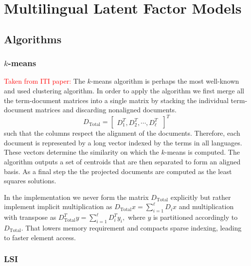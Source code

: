 \documentclass[twoside,11pt]{article}
\newcommand{\oldText}[1]{\textcolor{red}{#1:}\color{blue}}
\begin{document}
\section{Multilingual Latent Factor Models}

\subsection{Algorithms}

\subsubsection{$k$-means}

{\oldText{Taken from ITI paper}
The $k$-means algorithm is perhaps the most well-known and used clustering algorithm. In order to apply the algorithm we first merge all the term-document matrices into a single matrix by stacking the individual term-document matrices and discarding nonaligned documents.
$$D_{\mbox{Total}} = \begin{bmatrix}D^T_1 ,D^T_2, \cdots,D^T_\ell\ \end{bmatrix}^T$$
such that the columns respect the alignment of the documents. Therefore, each document  is represented by a long vector indexed by the terms in all languages. These vectors determine the similarity on which the $k$-means is computed. The algorithm outputs a set of centroids that are then separated to form an aligned basis. As a final step the the projected documents are computed as the least squares solutions.

In the implementation we never form the matrix $D_{\mbox{Total}}$ explicitly but rather implement implicit multiplication as $D_{\mbox{Total}} x = \sum_{i=1}^\ell D_i x$ and multiplication with transpose as $D_{\mbox{Total}}^T y = \sum_{i=1}^\ell D_i^T y_i,$ where $y$ is partitioned accordingly to $D_{\mbox{Total}}.$ That lowers memory requirement and compacts sparse indexing, leading to faster element access. 
}

\subsubsection{LSI}
\end{document}
